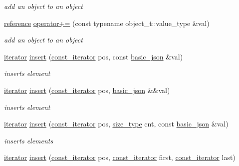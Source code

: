 \begin{DoxyCompactItemize}
\begin{DoxyCompactList}\small\item\em add an object to an object \end{DoxyCompactList}\item 
\hyperlink{classnlohmann_1_1basic__json_a3ec8e17be8732fe436e9d6733f52b7a3}{reference} \hyperlink{classnlohmann_1_1basic__json_a9486a272e034c0548305d7a12f3045e6}{operator+=} (const typename object\-\_\-t\-::value\-\_\-type \&val)
\begin{DoxyCompactList}\small\item\em add an object to an object \end{DoxyCompactList}\item 
\hyperlink{classnlohmann_1_1basic__json_1_1iterator}{iterator} \hyperlink{classnlohmann_1_1basic__json_a7f7bbb3a9efef2e2442f538a24c1c47b}{insert} (\hyperlink{classnlohmann_1_1basic__json_1_1const__iterator}{const\-\_\-iterator} pos, const \hyperlink{classnlohmann_1_1basic__json}{basic\-\_\-json} \&val)
\begin{DoxyCompactList}\small\item\em inserts element \end{DoxyCompactList}\item 
\hyperlink{classnlohmann_1_1basic__json_1_1iterator}{iterator} \hyperlink{classnlohmann_1_1basic__json_a8468efcfcd95db15f46887b29924ed5c}{insert} (\hyperlink{classnlohmann_1_1basic__json_1_1const__iterator}{const\-\_\-iterator} pos, \hyperlink{classnlohmann_1_1basic__json}{basic\-\_\-json} \&\&val)
\begin{DoxyCompactList}\small\item\em inserts element \end{DoxyCompactList}\item 
\hyperlink{classnlohmann_1_1basic__json_1_1iterator}{iterator} \hyperlink{classnlohmann_1_1basic__json_a624025acfcf64364d98424402b837bc6}{insert} (\hyperlink{classnlohmann_1_1basic__json_1_1const__iterator}{const\-\_\-iterator} pos, \hyperlink{classnlohmann_1_1basic__json_a1579a8f72a230358d6cd1a6e8a62859b}{size\-\_\-type} cnt, const \hyperlink{classnlohmann_1_1basic__json}{basic\-\_\-json} \&val)
\begin{DoxyCompactList}\small\item\em inserts elements \end{DoxyCompactList}\item 
\hyperlink{classnlohmann_1_1basic__json_1_1iterator}{iterator} \hyperlink{classnlohmann_1_1basic__json_aeaa0644fd6b99af364e772092268dfd6}{insert} (\hyperlink{classnlohmann_1_1basic__json_1_1const__iterator}{const\-\_\-iterator} pos, \hyperlink{classnlohmann_1_1basic__json_1_1const__iterator}{const\-\_\-iterator} first, \hyperlink{classnlohmann_1_1basic__json_1_1const__iterator}{const\-\_\-iterator} last)

\end{DoxyCompactItemize}
